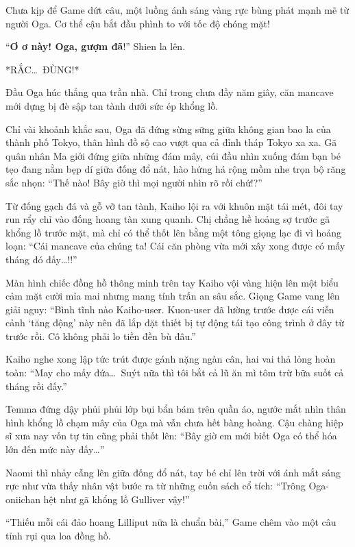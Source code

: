 \documentclass[../main.tex]{subfiles}
\begin{document}
Chưa kịp để Game dứt câu, một luồng ánh sáng vàng rực bùng phát mạnh mẽ từ người Oga. Cơ thể cậu bắt đầu phình to với tốc độ chóng mặt!

``\textbf{Ơ ơ này! Oga, gượm đã}!'' Shien la lên.

*RẮC\dots\ ĐÙNG!*

Đầu Oga húc thẳng qua trần nhà. Chỉ trong chưa đầy năm giây, căn mancave mới dựng bị đè sập tan tành dưới sức ép khổng lồ.

Chỉ vài khoảnh khắc sau, Oga đã đứng sừng sững giữa không gian bao la của thành phố Tokyo, thân hình đồ sộ cao vượt qua cả đỉnh tháp Tokyo xa xa. Gã quân nhân Ma giới đứng giữa những đám mây, cúi đầu nhìn xuống đám bạn bé tẹo đang nằm bẹp dí giữa đống đổ nát, hào hứng há rộng mồm nhe trọn bộ răng sắc nhọn: ``Thế nào! Bây giờ thì mọi người nhìn rõ rồi chứ!?''


Từ đống gạch đá và gỗ vỡ tan tành, Kaiho lội ra với khuôn mặt tái mét, đôi tay run rẩy chỉ vào đống hoang tàn xung quanh. Chị chẳng hề hoảng sợ trước gã khổng lồ trước mặt, mà chỉ có thể thốt lên bằng một tông giọng lạc đi vì hoảng loạn: ``Cái mancave của chúng ta! Cái căn phòng vừa mới xây xong được có mấy tháng đó đấy\dots!!''

Màn hình chiếc đồng hồ thông minh trên tay Kaiho vội vàng hiện lên một biểu cảm mặt cười mỉa mai nhưng mang tính trấn an sâu sắc. Giọng Game vang lên giải nguy: ``Bình tĩnh nào Kaiho-user. Kuon-user đã lường trước được cái viễn cảnh `tăng động' này nên đã lắp đặt thiết bị tự động tái tạo công trình ở đây từ trước rồi. Cô không phải lo tiền đền bù đâu.''

Kaiho nghe xong lập tức trút được gánh nặng ngàn cân, hai vai thả lỏng hoàn toàn: ``May cho mấy đứa\dots\ Suýt nữa thì tôi bắt cả lũ ăn mì tôm trừ bữa suốt cả tháng rồi đấy.''

Temma đứng dậy phủi phủi lớp bụi bẩn bám trên quần áo, ngước mắt nhìn thân hình khổng lồ chạm mây của Oga mà vẫn chưa hết bàng hoàng. Cậu chàng hiệp sĩ xưa nay vốn tự tin cũng phải thốt lên: ``Bây giờ em mới biết Oga có thể hóa lớn đến mức này đấy\dots''

Naomi thì nhảy cẫng lên giữa đống đổ nát, tay bé chỉ lên trời với ánh mắt sáng rực như vừa thấy nhân vật bước ra từ những cuốn sách cổ tích: ``Trông Oga-oniichan hệt như gã khổng lồ Gulliver vậy!''

``Thiếu mỗi cái đảo hoang Lilliput nữa là chuẩn bài,'' Game chêm vào một câu tỉnh rụi qua loa đồng hồ.
\end{document}
